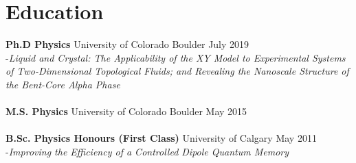 \documentclass[12pt, a4paper]{scrartcl}
\begin{document}
\section*{Education}          
\vspace{-.1in}
   \noindent \textbf{Ph.D Physics}  University of Colorado Boulder \dotfill July 2019  \\        
    \indent -{\itshape Liquid and Crystal: The Applicability of the XY Model to
        Experimental Systems of Two-Dimensional Topological Fluids; and
    Revealing the Nanoscale Structure of the Bent-Core Alpha Phase} \\
    \vspace{-0.75em}
    \phantom{.}\\
\noindent\textbf{M.S. Physics} University of Colorado Boulder \dotfill  May 2015
\\
\vspace{-0.75em}
    \phantom{.}\\

\noindent\textbf{B.Sc. Physics Honours (First Class)} University of Calgary \dotfill May 2011   \\       
\indent -{\itshape Improving the Efficiency of a Controlled Dipole Quantum
    Memory}\\

 
\vspace{-0.2in}	
\end{document}
